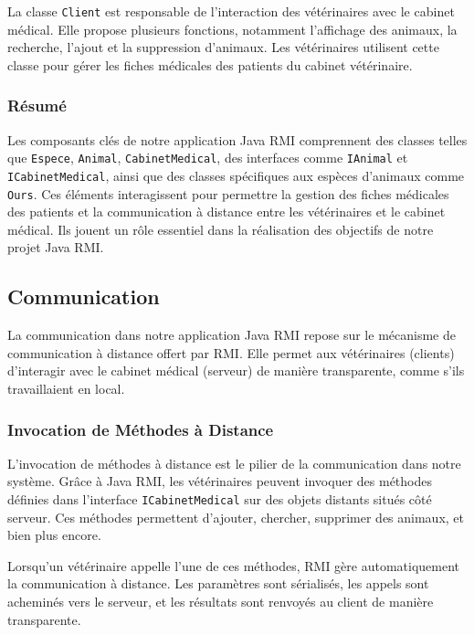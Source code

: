 \documentclass{article} %
\begin{document}
La classe \texttt{Client} est responsable de l'interaction des vétérinaires avec le cabinet médical. Elle propose plusieurs fonctions, notamment l'affichage des animaux, la recherche, l'ajout et la suppression d'animaux. Les vétérinaires utilisent cette classe pour gérer les fiches médicales des patients du cabinet vétérinaire.

\subsubsection{Résumé}

Les composants clés de notre application Java RMI comprennent des classes telles que \texttt{Espece}, \texttt{Animal}, \texttt{CabinetMedical}, des interfaces comme \texttt{IAnimal} et \texttt{ICabinetMedical}, ainsi que des classes spécifiques aux espèces d'animaux comme \texttt{Ours}. Ces éléments interagissent pour permettre la gestion des fiches médicales des patients et la communication à distance entre les vétérinaires et le cabinet médical. Ils jouent un rôle essentiel dans la réalisation des objectifs de notre projet Java RMI.

\subsection{Communication}

La communication dans notre application Java RMI repose sur le mécanisme de communication à distance offert par RMI. Elle permet aux vétérinaires (clients) d'interagir avec le cabinet médical (serveur) de manière transparente, comme s'ils travaillaient en local.

\subsubsection{Invocation de Méthodes à Distance}

L'invocation de méthodes à distance est le pilier de la communication dans notre système. Grâce à Java RMI, les vétérinaires peuvent invoquer des méthodes définies dans l'interface \texttt{ICabinetMedical} sur des objets distants situés côté serveur. Ces méthodes permettent d'ajouter, chercher, supprimer des animaux, et bien plus encore.

Lorsqu'un vétérinaire appelle l'une de ces méthodes, RMI gère automatiquement la communication à distance. Les paramètres sont sérialisés, les appels sont acheminés vers le serveur, et les résultats sont renvoyés au client de manière transparente.
\end{document}
